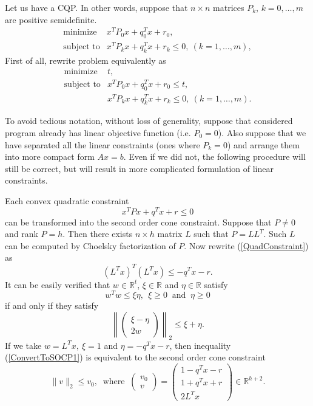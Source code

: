 \documentclass[12pt]{book}
\theoremstyle{definition}
\begin{document}
Let us have a CQP. In other words, suppose that $n\times n$ matrices $P_k$, $k=0,\dots ,m$ are positive semidefinite. 
\begin{equation}
\begin{array}{ll}
\mbox{minimize}& x^TP_0x + q_0^Tx + r_0, \\
\mbox{subject to}& x^TP_kx + q_k^Tx + r_k \leq 0, \  (k = 1,\dots ,m),
\end{array} 
\end{equation}
First of all, rewrite problem equivalently as
\begin{equation}
\begin{array}{ll}
\mbox{minimize}& t, \\
\mbox{subject to} & x^TP_0x + q_0^Tx + r_0 \leq t,\\
& x^TP_kx + q_k^Tx + r_k \leq 0, \  (k = 1,\dots ,m).
\end{array} 
\end{equation}

To avoid tedious notation, without loss of generality, suppose that considered program already has linear objective function (i.e. $P_0 = 0$).  Also suppose that we have separated all the linear constraints (ones where $P_k = 0$) and arrange them into more compact form $Ax=b$. Even if we did not, the following procedure will still be correct, but will result in more complicated formulation of linear constraints.

Each convex quadratic constraint 
\begin{equation}
\label{QuadConstraint}
x^TPx + q^Tx + r \leq 0
\end{equation} 
can be transformed into the second order cone constraint.  Suppose that $P\neq 0$ and rank $P = h.$ Then there exists $n\times h$ matrix $L$ such that $P=LL^T$. Such $L$ can be computed by Choelsky factorization of $P$. Now rewrite (\ref{QuadConstraint}) as 
\begin{equation}
\label{ConvertToSOCP1}
(L^Tx)^T(L^Tx)\leq -q^Tx - r.
\end{equation}
It can be easily verified that $w\in \mathbb{R}^t$, $\xi \in \mathbb{R}$ and $\eta \in \mathbb{R}$ satisfy
$$w^Tw\leq \xi\eta, \ \ \xi\geq 0\ \mbox{ and } \ \eta\geq 0$$
if and only if they satisfy
$$\left\|\left( \begin{array}{c}
\xi-\eta\\
2w
\end{array}\right)\right\|_2
\leq \xi+\eta . $$
If we take $w=L^Tx, \ \xi = 1$ and $\eta = -q^Tx - r$, then inequality (\ref{ConvertToSOCP1}) is equivalent to the second order cone constraint
\begin{equation}
\label{ConvertedQCintoSOCC}
 \|v\|_2\leq v_0, \ \mbox{  where  } \ \left(\begin{array}{c}
v_0\\
v
\end{array}\right) = 
\left(\begin{array}{c}
1- q^Tx - r\\
1 + q^Tx + r\\
2L^Tx
\end{array}\right)\in \mathbb{R}^{h+2}.
\end{equation}
\end{document}
